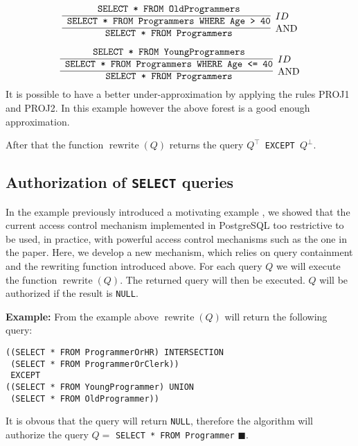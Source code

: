 \[
\infer[\text{AND}]
	{\text{\texttt{ SELECT * FROM Programmers}}}
	{
		\infer[ID]
		{\text{\texttt{ SELECT * FROM Programmers WHERE Age > 40}}}
		{\text{\texttt{ SELECT * FROM OldProgrammers}}}
	}	
\]

\[
\infer[\text{AND}]
	{\text{\texttt{ SELECT * FROM Programmers}}}
	{
		\infer[ID]
		{\text{\texttt{ SELECT * FROM Programmers WHERE Age <= 40}}}
		{\text{\texttt{ SELECT * FROM YoungProgrammers}}}
	}
\]
\noindent
It is possible to have a better under-approximation by applying the rules PROJ1 and PROJ2. In this example however the above forest is a good enough approximation.

After that the function $\operatorname{rewrite}(Q)$ returns the query \texttt{$Q^\top$ EXCEPT $Q^\bot$}.

\subsection{Authorization of \texttt{SELECT} queries}

In the example previously introduced a motivating example , we showed that the current access control mechanism implemented in PostgreSQL too restrictive to be used, in practice, with powerful access control mechanisms such as the one in the paper.
%
Here, we develop a new mechanism, which relies on query containment and the rewriting function introduced above.
%
For each query $Q$ we will execute the function $\operatorname{rewrite}(Q)$.
%
The returned query will then be executed.
%
$Q$ will be authorized if the result is \texttt{NULL}.

\smallskip
\noindent
{\bf Example:}
From the example above $\operatorname{rewrite}(Q)$ will return the following query:
\begin{verbatim}
((SELECT * FROM ProgrammerOrHR) INTERSECTION
 (SELECT * FROM ProgrammerOrClerk))
 EXCEPT
((SELECT * FROM YoungProgrammer) UNION
 (SELECT * FROM OldProgrammer))
\end{verbatim}
\noindent
It is obvous that the query will return \texttt{NULL}, therefore the algorithm will authorize the query $Q = $ \texttt{SELECT * FROM Programmer} $\blacksquare$.